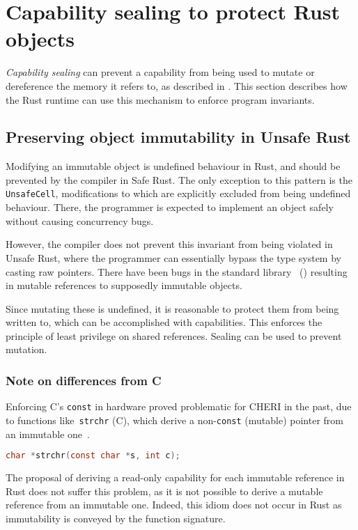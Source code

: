 \documentclass[dissertation.tex]{subfiles}
\begin{document}
\section{Capability sealing to protect Rust objects}

\emph{Capability sealing} can prevent a capability from being used to
mutate or dereference the memory it refers to, as described in
.
This section describes how the Rust runtime can use this mechanism to
enforce program invariants.

\subsection{Preserving object immutability in Unsafe Rust}
\label{sec:eval-rust-enforce-immut}

Modifying an immutable object is undefined behaviour in Rust, and should
be prevented by the compiler in Safe Rust.
The only exception to this pattern is the \texttt{UnsafeCell},
modifications to which are explicitly excluded from being undefined
behaviour.
There, the programmer is expected to implement an object safely without
causing concurrency bugs.

However, the compiler does not prevent this invariant from being
violated in Unsafe Rust, where the programmer can essentially bypass the
type system by casting raw pointers.
There have been bugs in the standard library~\cite{rust-issue-vec-mut}
() resulting in mutable references to
supposedly immutable objects.

Since mutating these is undefined, it is reasonable to protect them
from being written to, which can be accomplished with capabilities.
This enforces the principle of least privilege on shared references.
Sealing can be used to prevent mutation.

\subsubsection{Note on differences from C}
Enforcing C's \texttt{const} in hardware proved problematic for CHERI in
the past, due to functions like~\texttt{strchr} (C), which derive a
non-\texttt{const} (mutable) pointer from an immutable
one~\cite{cheri-prog-guide}.

\begin{lstlisting}[language=C]
char *strchr(const char *s, int c);
\end{lstlisting}

The proposal of deriving a read-only capability for each immutable
reference in Rust does not suffer this problem, as it is not possible to
derive a mutable reference from an immutable one.
Indeed, this idiom does not occur in Rust as immutability is conveyed by
the function signature.
\end{document}
